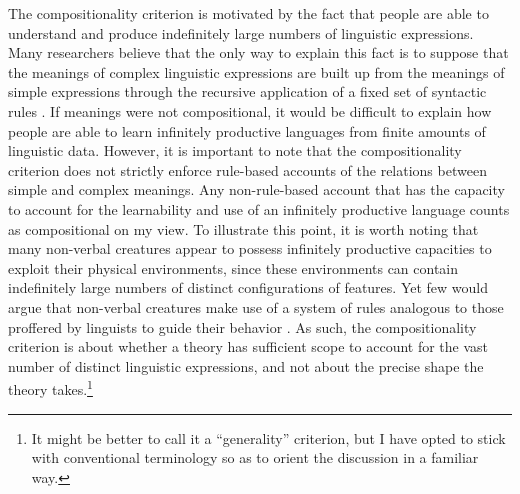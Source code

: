 The compositionality criterion is motivated by the fact that people are able to understand and produce indefinitely large numbers of linguistic expressions. Many researchers believe that the only way to explain this fact is to suppose that the meanings of complex linguistic expressions are built up from the meanings of simple expressions through the recursive application of a fixed set of syntactic rules \citep{Szabo:2012,Szabo:2013,FodorLepore:1991,Recanati:2012,Unnsteinsson:2014,Pinker:1994,FodorPylyshyn:1988,CappelenLepore:2005}. If meanings were not compositional, it would be difficult to explain how people are able to learn infinitely productive languages from finite amounts of linguistic data. However, it is important to note that the compositionality criterion does not strictly enforce rule-based accounts of the relations between simple and complex meanings. Any non-rule-based account that has the capacity to account for the learnability and use of an infinitely productive language counts as compositional on my view. To illustrate this point, it is worth noting that many non-verbal creatures appear to possess infinitely productive capacities to exploit their physical environments, since these environments can contain indefinitely large numbers of distinct configurations of features. Yet few would argue that non-verbal creatures make use of a system of rules analogous to those proffered by linguists to guide their behavior \citep[cf.][]{FodorPylyshyn:1988}. As such, the compositionality criterion is about whether a theory has sufficient scope to account for the vast number of distinct linguistic expressions, and not about the precise shape the theory takes.\footnote{It might be better to call it a ``generality'' criterion, but I have opted to stick with conventional terminology so as to orient the discussion in a familiar way.}

